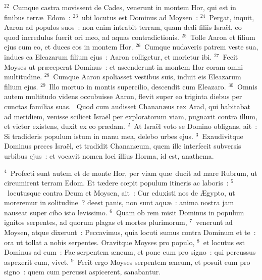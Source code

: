 ${}^{22}$~Cumque castra movissent de Cades, venerunt in montem Hor, qui est in finibus terr\ae\ Edom~:
${}^{23}$~ubi locutus est Dominus ad Moysen~:
${}^{24}$~Pergat, inquit, Aaron ad populos suos~: non enim intrabit terram, quam dedi filiis Isra\"el, eo quod incredulus fuerit ori meo, ad aquas contradictionis.
${}^{25}$~Tolle Aaron et filium ejus cum eo, et duces eos in montem Hor.
${}^{26}$~Cumque nudaveris patrem veste sua, indues ea Eleazarum filium ejus~: Aaron colligetur, et morietur ibi.
${}^{27}$~Fecit Moyses ut pr\ae ceperat Dominus~: et ascenderunt in montem Hor coram omni multitudine.
${}^{28}$~Cumque Aaron spoliasset vestibus suis, induit eis Eleazarum filium ejus.
${}^{29}$~Illo mortuo in montis supercilio, descendit cum Eleazaro.
${}^{30}$~Omnis autem multitudo videns occubuisse Aaron, flevit super eo triginta diebus per cunctas familias suas.
~\lettrine[lines=10,image=true,loversize=0.05,lraise=-0.03]{Q}{}uod cum audisset Chanan\ae us rex Arad, qui habitabat ad meridiem, venisse scilicet Isra\"el per exploratorum viam, pugnavit contra illum, et victor existens, duxit ex eo pr\ae dam.
${}^{2}$~At Isra\"el voto se Domino obligans, ait~: Si tradideris populum istum in manu mea, delebo urbes ejus.
${}^{3}$~Exaudivitque Dominus preces Isra\"el, et tradidit Chanan\ae um, quem ille interfecit subversis urbibus ejus~: et vocavit nomen loci illius Horma, id est, anathema.


${}^{4}$~Profecti sunt autem et de monte Hor, per viam qu\ae\ ducit ad mare Rubrum, ut circumirent terram Edom. Et t\ae dere cœpit populum itineris ac laboris~:
${}^{5}$~locutusque contra Deum et Moysen, ait~: Cur eduxisti nos de \AE gypto, ut moreremur in solitudine~? deest panis, non sunt aqu\ae~: anima nostra jam nauseat super cibo isto levissimo.
${}^{6}$~Quam ob rem misit Dominus in populum ignitos serpentes, ad quorum plagas et mortes plurimorum,
${}^{7}$~venerunt ad Moysen, atque dixerunt~: Peccavimus, quia locuti sumus contra Dominum et te~: ora ut tollat a nobis serpentes. Oravitque Moyses pro populo,
${}^{8}$~et locutus est Dominus ad eum~: Fac serpentem \ae neum, et pone eum pro signo~: qui percussus aspexerit eum, vivet.
${}^{9}$~Fecit ergo Moyses serpentem \ae neum, et posuit eum pro signo~: quem cum percussi aspicerent, sanabantur.


